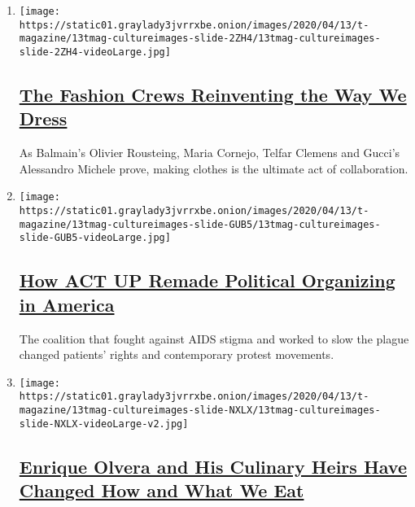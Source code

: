 \begin{enumerate}
\def\labelenumi{\arabic{enumi}.}
\item
  \texttt{[image: https://static01.graylady3jvrrxbe.onion/images/2020/04/13/t-magazine/13tmag-cultureimages-slide-2ZH4/13tmag-cultureimages-slide-2ZH4-videoLarge.jpg]}

  \hypertarget{the-fashion-crews-reinventing-the-way-we-dress}{%
  \subsection{\texorpdfstring{\href{/interactive/2020/04/13/t-magazine/maria-cornejo-olivier-rousteing-telfar-clemens-alessandro-michele.html}{The
  Fashion Crews Reinventing the Way We
  Dress}}{The Fashion Crews Reinventing the Way We Dress}}\label{the-fashion-crews-reinventing-the-way-we-dress}}

  As Balmain's Olivier Rousteing, Maria Cornejo, Telfar Clemens and
  Gucci's Alessandro Michele prove, making clothes is the ultimate act
  of collaboration.
\item
  \texttt{[image: https://static01.graylady3jvrrxbe.onion/images/2020/04/13/t-magazine/13tmag-cultureimages-slide-GUB5/13tmag-cultureimages-slide-GUB5-videoLarge.jpg]}

  \hypertarget{how-act-up-remade-political-organizing-in-america}{%
  \subsection{\texorpdfstring{\href{/interactive/2020/04/13/t-magazine/act-up-aids.html}{How
  ACT UP Remade Political Organizing in
  America}}{How ACT UP Remade Political Organizing in America}}\label{how-act-up-remade-political-organizing-in-america}}

  The coalition that fought against AIDS stigma and worked to slow the
  plague changed patients' rights and contemporary protest movements.
\item
  \texttt{[image: https://static01.graylady3jvrrxbe.onion/images/2020/04/13/t-magazine/13tmag-cultureimages-slide-NXLX/13tmag-cultureimages-slide-NXLX-videoLarge-v2.jpg]}

  \hypertarget{enrique-olvera-and-his-culinary-heirs-have-changed-how-and-what-we-eat}{%
  \subsection{\texorpdfstring{\href{/interactive/2020/04/13/t-magazine/enrique-olvera-chef.html}{Enrique
  Olvera and His Culinary Heirs Have Changed How and What We
  Eat}}{Enrique Olvera and His Culinary Heirs Have Changed How and What We Eat}}\label{enrique-olvera-and-his-culinary-heirs-have-changed-how-and-what-we-eat}}


\end{enumerate}
